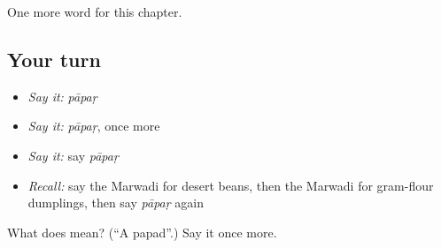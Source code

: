 \begin{grammarlens}[title={What you've built}]
One more word for this chapter.
\end{grammarlens}

\subsection*{Your turn}
\begin{itemize}
\raggedright
  \item \emph{Say it:} \emph{pāpaṛ}
  \item \emph{Say it:} \emph{pāpaṛ}, once more
  \item \emph{Say it:} say \emph{pāpaṛ}
  \item \emph{Recall:} say the Marwadi for desert beans, then the Marwadi for gram-flour dumplings, then say \emph{pāpaṛ} again
\end{itemize}

\begin{tcolorbox}[breakable,colback=teal!4,colframe=teal!35!black,title={Before you move on}]
What does  mean? (\textquotedblleft{}A papad\textquotedblright{}.) Say it once more.
\end{tcolorbox}
